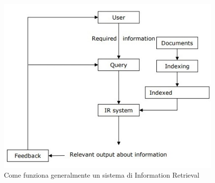 \begin{figure}[H]
    \includegraphics{images/comefunzionair.jpg}
    \caption{Come funziona generalmente un sistema di Information Retrieval}
\end{figure}